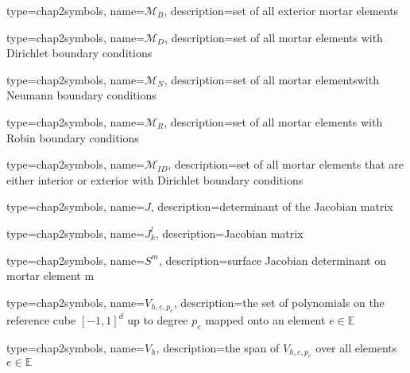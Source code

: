                  {
                   type=chap2symbols,
                   name=$\mathcal{M}_B$,
                   description={set of all exterior mortar elements}
                 }


                 {
                   type=chap2symbols,
                   name=$\mathcal{M}_D$,
                   description={set of all mortar elements with Dirichlet boundary conditions}
                 }

                 {
                   type=chap2symbols,
                   name=$\mathcal{M}_N$,
                   description={set of all mortar elementswith Neumann boundary conditions}
                 }


                 {
                   type=chap2symbols,
                   name=$\mathcal{M}_R$,
                   description={set of all mortar elements with Robin boundary conditions}
                 }


                 {
                   type=chap2symbols,
                   name=$\mathcal{M}_{ID}$,
                   description={set of all mortar elements that are either interior or exterior with Dirichlet boundary conditions}
                 }



                 {
                   type=chap2symbols,
                   name=$J$,
                   description={determinant of the Jacobian matrix}
                 }



                 {
                   type=chap2symbols,
                   name=$J^l_k$,
                   description={Jacobian matrix}
                 }


                 {
                   type=chap2symbols,
                   name=$S^m$,
                   description={surface Jacobian determinant on mortar element m}
                 }

                 {
                   type=chap2symbols,
                   name=$V_{h,e,p_e}$,
                   description={the set of polynomials on the reference cube $[-1,1]^d$ up to degree $p_e$ mapped onto an element $e \in \mathbb{E}$}
                 }


                 {
                   type=chap2symbols,
                   name=$V_{h}$,
                   description={the span of $V_{h,e,p_e}$ over all elements $e \in \mathbb{E}$}
                 }


